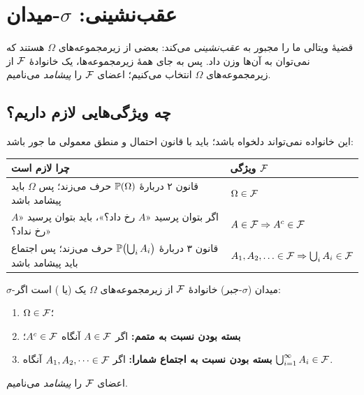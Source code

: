 \section{عقب‌نشینی: $\sigma$-میدان}

قضیهٔ ویتالی ما را مجبور به \emph{عقب‌نشینی} می‌کند: بعضی از زیرمجموعه‌های $\Omega$ هستند که نمی‌توان به آن‌ها وزن داد. پس به جای همهٔ زیرمجموعه‌ها، یک خانوادهٔ $\F$ از زیرمجموعه‌های $\Omega$ انتخاب می‌کنیم؛  اعضای $\F$ را \emph{پیشامد} می‌نامیم.

\subsection{چه ویژگی‌هایی لازم داریم؟}

این خانواده نمی‌تواند دلخواه باشد؛ باید با قانون احتمال و منطق معمولی ما جور باشد:

\begin{center}
\renewcommand{\arraystretch}{1.45}
\begin{tabular}{l l}
\toprule
\textbf{چرا لازم است} & \textbf{ویژگی $\F$}\\
\midrule
قانون ۲ دربارهٔ $\P(\Omega)$ حرف می‌زند؛ پس $\Omega$ باید پیشامد باشد & $\Omega\in\F$\\
اگر بتوان پرسید «$A$ رخ داد؟»، باید بتوان پرسید «$A$ رخ نداد؟» & $A\in\F\Rightarrow A^c\in\F$\\
قانون ۳ دربارهٔ $\P\bigl(\bigcup_iA_i\bigr)$ حرف می‌زند؛ پس اجتماع باید پیشامد باشد & $A_1,A_2,\ldots\in\F\Rightarrow\bigcup_iA_i\in\F$\\
\bottomrule
\end{tabular}
\end{center}

\begin{definition}[label=def:sigma]{$\sigma$-میدان ($\sigma$-جبر)}
خانوادهٔ $\F$ از زیرمجموعه‌های $\Omega$ یک  (یا ) است اگر:
\begin{enumerate}
  \item $\Omega\in\F$؛
  \item \textbf{بسته بودن نسبت به متمم:} اگر $A\in\F$ آنگاه $A^c\in\F$؛
  \item \textbf{بسته بودن نسبت به اجتماع شمارا:} اگر $A_1,A_2,\dots\in\F$ آنگاه $\bigcup_{i=1}^\infty A_i\in\F$.
\end{enumerate}
اعضای $\F$ را \emph{پیشامد} می‌نامیم.
\end{definition}


